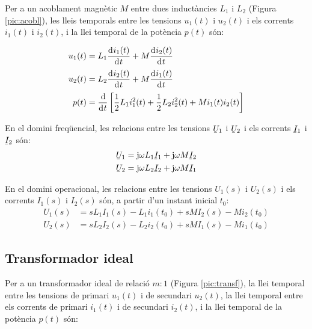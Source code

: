 Per a un acoblament magnètic $M$ entre dues
inductàncies $L_1$ i $L_2$ (Figura \vref{pic:acobl}), les lleis temporals entre les
tensions $u_1(t)$ i $u_2(t)$ i els corrents $i_1(t)$ i $i_2(t)$,  i la llei temporal
de la potència $p(t)$ són:

\hfill
\begin{minipage}[b]{6.5cm}
   
   \label{pic:acobl}
\end{minipage}
\hfill
\begin{minipage}[b][3.8cm][t]{10cm}
   \begin{align}
      u_1(t) &= L_1 \deriv{i_1(t)}{t} + M \deriv{i_2(t)}{t} \\
      u_2(t) &= L_2 \deriv{i_2(t)}{t} + M \deriv{i_1(t)}{t} \\
      p(t) &= \frac{\diff}{\diff t} \left[ \frac{1}{2} L_1 i_1^2(t) + \frac{1}{2} L_2 i_2^2(t) +
      M i_1(t) i_2(t) \right]
   \end{align}
\end{minipage}


En el domini freqüencial, les relacions entre les tensions $\cmplx{U}_1$ i $\cmplx{U}_2$ i els corrents $\cmplx{I}_1$ i $\cmplx{I}_2$ són:
\begin{align}
   \cmplx{U}_1 &= \ju \omega L_1 \cmplx{I}_1 + \ju \omega M \cmplx{I}_2 \\
   \cmplx{U}_2 &= \ju \omega L_2 \cmplx{I}_2 + \ju \omega M \cmplx{I}_1
\end{align}

En el domini operacional, les relacions entre les tensions $U_1(s)$  i $U_2(s)$ i els corrents $I_1(s)$ i $I_2(s)$ són, a partir d'un instant inicial $t_0$:
\begin{align}
   U_1(s) &= s L_1 I_1(s) - L_1 i_1(t_0) + s M I_2(s) - M i_2(t_0) \\
   U_2(s) &= s L_2 I_2(s) - L_2 i_2(t_0) + s M I_1(s) - M i_1(t_0)
\end{align}

\subsection{Transformador ideal} 

Per a un transformador
ideal de relació $m\!:\!1$ (Figura \vref{pic:transf}), la llei temporal
entre les tensions de primari $u_1(t)$ i de secundari $u_2(t)$, la
llei temporal entre els corrents de primari $i_1(t)$ i de secundari
$i_2(t)$, i la llei temporal de la potència $p(t)$ són:

